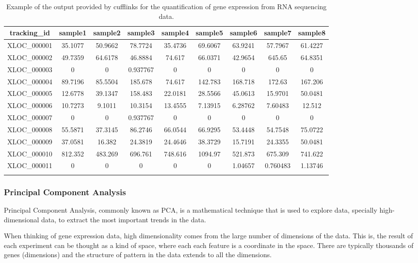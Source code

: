 \documentclass[11pt, oneside]{article}   	%
\begin{document}
\begin{table}[h]
    \centering
    \caption{Example of the output provided by cufflinks for the quantification of gene expression from RNA sequencing data.}
    \begin{tabular}{c|c|c|c|c|c|c|c|c}
    tracking\_id & sample1 & sample2 & sample3 & sample4 & sample5 & sample6 & sample7 & sample8 \\
    \hline
    XLOC\_000001 & 35.1077 & 50.9662 & 78.7724 & 35.4736 & 69.6067 & 63.9241 & 57.7967 & 61.4227 \\
    XLOC\_000002 & 49.7359 & 64.6178 & 46.8884 & 74.617 & 66.0371 & 42.9654 & 645.65 & 64.8351 \\
    XLOC\_000003 & 0 & 0 & 0.937767 & 0 & 0 & 0 & 0 & 0\\
    XLOC\_000004 & 89.7196 & 85.5504 & 185.678 & 74.617 & 142.783 & 168.718 & 172.63 & 167.206 \\
    XLOC\_000005 & 12.6778 & 39.1347 & 158.483 & 22.0181 & 28.5566 & 45.0613 & 15.9701 & 50.0481 \\
    XLOC\_000006 & 10.7273 & 9.1011 & 10.3154 & 13.4555 & 7.13915 & 6.28762 & 7.60483 & 12.512 \\
    XLOC\_000007 & 0 & 0 & 0.937767 & 0 & 0 & 0 & 0 & 0 \\
    XLOC\_000008 & 55.5871 & 37.3145 & 86.2746 & 66.0544 & 66.9295 & 53.4448 & 54.7548 & 75.0722 \\
    XLOC\_000009 & 37.0581 & 16.382 & 24.3819 & 24.4646 & 38.3729 & 15.7191 & 24.3355 & 50.0481 \\
    XLOC\_000010 & 812.352 & 483.269 & 696.761 & 748.616 & 1094.97 & 521.873 & 675.309 & 741.622 \\
    XLOC\_000011 & 0 & 0 & 0 & 0 & 0 & 1.04657 & 0.760483 & 1.13746\\
    \hline
    \label{tab:ExpressionCufflinks}
    \end{tabular}
\end{table}




\subsubsection{Principal Component Analysis}

Principal Component Analysis, commonly known as PCA, is a mathematical technique that is used to explore data, specially high-dimensional data, to extract the most important trends in the data.

When thinking of gene expression data, high dimensionality comes from the large number of dimensions of the data. This is, the result of each experiment can be thought as a kind of space, where each each feature is a coordinate in the space. There are typically thousands of genes (dimensions) and the structure of pattern in the data extends to all the dimensions. 
\end{document}
